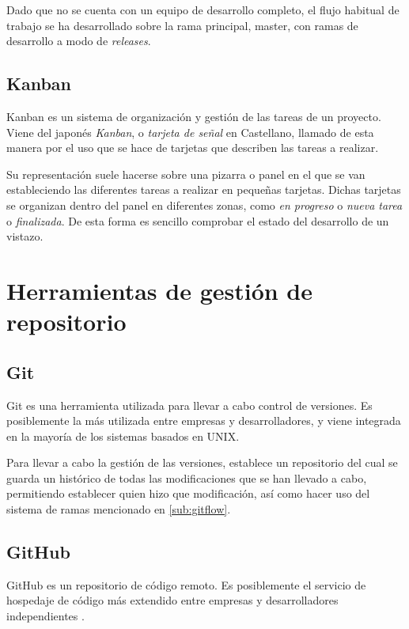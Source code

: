 Dado que no se cuenta con un equipo de desarrollo completo, el flujo habitual de trabajo se ha desarrollado sobre la rama principal, master, con ramas de desarrollo a modo de \textit{releases}. 

\subsection{Kanban}
\label{sub:Kanban}

Kanban es un sistema de organización y gestión de las tareas de un proyecto. \citep{wiki:Kanban}
Viene del japonés \textit{Kanban}, o \textit{tarjeta de señal} en Castellano, llamado de esta manera por el uso que se hace de tarjetas que describen las tareas a realizar. 

Su representación suele hacerse sobre una pizarra o panel en el que se van estableciendo las diferentes tareas a realizar en pequeñas tarjetas. Dichas tarjetas se organizan dentro del panel en diferentes zonas, como \textit{en progreso} o \textit{nueva tarea} o \textit{finalizada}. 
De esta forma es sencillo comprobar el estado del desarrollo de un vistazo. 

\section{Herramientas de gestión de repositorio}

\subsection{Git}

Git es una herramienta utilizada para llevar a cabo control de versiones. Es posiblemente la más utilizada entre empresas y desarrolladores, y viene integrada en la mayoría de los sistemas basados en UNIX.

Para llevar a cabo la gestión de las versiones, establece un repositorio del cual se guarda un histórico de todas las modificaciones que se han llevado a cabo, permitiendo establecer quien hizo que modificación, así como hacer uso del sistema de ramas mencionado en \ref{sub:gitflow}. 

\subsection{GitHub}

GitHub es un repositorio de código remoto. Es posiblemente el servicio de hospedaje de código más extendido entre empresas y desarrolladores independientes \citep{wiki:GitHub}.

